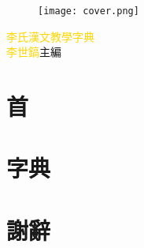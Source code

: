 \documentclass[a5paper,11pt]{report}
\begin{document}
\begin{titlepage}
\doublespacing
\begin{wrapfigure}{r}{50mm}
\texttt{[image: cover.png]}
\end{wrapfigure}
\hfill
\vfill
{\Huge\textcolor{gold}{李氏漢文教學字典}}\\
{\textcolor{gold}{李世鎬}\hspace{14pt}主編}
\vspace{64pt}
\end{titlepage}
\pagebreak
\vfill
\pagebreak
\chapter*{首}
\doublespacing


\chapter*{字典}
\begin{multicols}{3}
\onehalfspacing

\end{multicols}

\chapter*{謝辭}
\doublespacing

\end{document}
